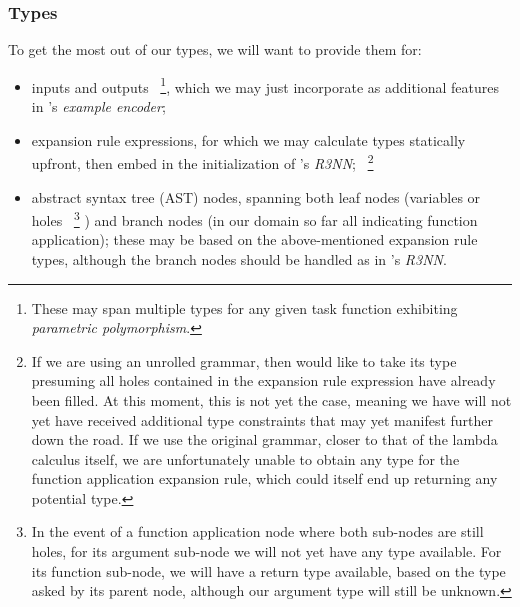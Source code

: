 \documentclass{article}
\begin{document}
\subsubsection{Types} \label{sec:typednsps}


To get the most out of our types, we will want to provide them for:
\begin{itemize}
    \item inputs and outputs%
    ~\footnote{
        These may span multiple types for any given task function exhibiting \emph{parametric polymorphism}.
    },
    which we may just incorporate as additional features in \citet{nsps}'s \emph{example encoder};
    \item expansion rule expressions, for which we may calculate types statically upfront, then embed
    in the initialization of \citet{nsps}'s \emph{R3NN};%
    ~\footnote{
        If we are using an unrolled grammar,
        then would like to take its type presuming all holes contained in the expansion rule expression have already been filled.
        At this moment, this is not yet the case,
        meaning we have will not yet have received additional type constraints that may yet manifest further down the road.
        If we use the original grammar,
        closer to that of the lambda calculus itself,
        we are unfortunately unable to obtain any type for the function application expansion rule,
        which could itself end up returning any potential type.
    }
    \item abstract syntax tree (AST) nodes, spanning both leaf nodes (variables or holes%
    ~\footnote{
        In the event of a function application node where both sub-nodes are still holes,
        for its argument sub-node we will not yet have any type available.
        For its function sub-node, we will have a return type available,
        based on the type asked by its parent node,
        although our argument type will still be unknown.
    }
    ) and branch nodes (in our domain so far all indicating function application); these may be based on the above-mentioned expansion rule types, although the branch nodes should be handled as in \citet{nsps}'s \emph{R3NN}.
\end{itemize}
\end{document}
